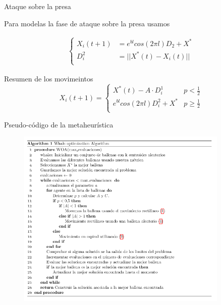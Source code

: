 \documentclass{beamer}
\begin{document}
\begin{frame}{Ataque sobre la presa}
    
    Para modelas la fase de ataque sobre la presa usamos

    \begin{align}
        \begin{cases}
            X_i(t+1) &= e^{bl}cos(2\pi l)D_2 + X^* \\
            D^2_i &= ||X^*(t)-X_i(t)||\\
        \end{cases}\label{eq:2}
    \end{align}

\end{frame}
\begin{frame}{Resumen de los movimeintos}
    \[
    X_i(t+1) =  
\begin{cases}
    X^*(t) - A\cdot D^1_i & p < \frac{1}{2}\\
    e^{bl}cos(2\pi l)D^2_i + X^*  & p\geq \frac{1}{2}\\  
\end{cases}
    \]

\end{frame}
\begin{frame}{Pseudo-código de la metaheurística}
    \begin{figure}[H]
        \centering
        \includegraphics[width=0.9\textwidth]{images/code}
        \end{figure}    
\end{frame}
\end{document}
